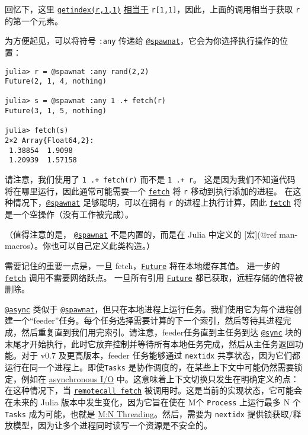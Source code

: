 回忆下，这里 \hyperlink{16989482368752175706}{\texttt{getindex(r,1,1)}} \hyperlink{16717190941363337071}{相当于} \texttt{r[1,1]}，因此，上面的调用相当于获取 \texttt{r} 的第一个元素。



为方便起见，可以将符号 \texttt{:any} 传递给 \hyperlink{11231712027010946923}{\texttt{@spawnat}}，它会为你选择执行操作的位置：




\begin{verbatim}
julia> r = @spawnat :any rand(2,2)
Future(2, 1, 4, nothing)

julia> s = @spawnat :any 1 .+ fetch(r)
Future(3, 1, 5, nothing)

julia> fetch(s)
2×2 Array{Float64,2}:
 1.38854  1.9098
 1.20939  1.57158
\end{verbatim}



请注意，我们使用了 \texttt{1 .+ fetch(r)} 而不是 \texttt{1 .+ r}。 这是因为我们不知道代码将在哪里运行，因此通常可能需要一个 \hyperlink{11007884648860062495}{\texttt{fetch}} 将 \texttt{r} 移动到执行添加的进程。 在这种情况下，\hyperlink{11231712027010946923}{\texttt{@spawnat}} 足够聪明，可以在拥有 \texttt{r} 的进程上执行计算，因此 \hyperlink{11007884648860062495}{\texttt{fetch}} 将是一个空操作（没有工作被完成）。



（值得注意的是， \hyperlink{11231712027010946923}{\texttt{@spawnat}} 不是内置的，而是在 Julia 中定义的 [宏](@ref man-macros）。你也可以自己定义此类构造。）



需要记住的重要一点是，一旦 fetch，\hyperlink{4170271048165085864}{\texttt{Future}} 将在本地缓存其值。 进一步的 \hyperlink{11007884648860062495}{\texttt{fetch}} 调用不需要网络跃点。 一旦所有引用 \hyperlink{4170271048165085864}{\texttt{Future}} 都已获取，远程存储的值将被删除。



\hyperlink{10770947021537241619}{\texttt{@async}} 类似于 \hyperlink{11231712027010946923}{\texttt{@spawnat}}，但只在本地进程上运行任务。我们使用它为每个进程创建一个“feeder”任务。每个任务选择需要计算的下一个索引，然后等待其进程完成，然后重复直到我们用完索引。请注意，feeder任务直到主任务到达 \hyperlink{7188613740509403855}{\texttt{@sync}} 块的末尾才开始执行，此时它放弃控制并等待所有本地任务完成，然后从主任务返回功能。对于 v0.7 及更高版本，feeder 任务能够通过 \texttt{nextidx} 共享状态，因为它们都运行在同一个进程上。即使\texttt{Tasks} 是协作调度的，在某些上下文中可能仍然需要锁定，例如在 \hyperlink{13392280388075867710}{asynchronous I/O} 中。这意味着上下文切换只发生在明确定义的点：在这种情况下，当 \hyperlink{17262349333771600150}{\texttt{remotecall\_fetch}} 被调用时。这是当前的实现状态，它可能会在未来的 Julia 版本中发生变化，因为它旨在使在 M个 \texttt{Process} 上运行最多 N 个 \texttt{Tasks} 成为可能，也就是 \href{https://en.wikipedia.org/wiki/Thread\_(computing)\#Models}{M:N Threading}。然后，需要为 \texttt{nextidx} 提供锁获取/释放模型，因为让多个进程同时读写一个资源是不安全的。



